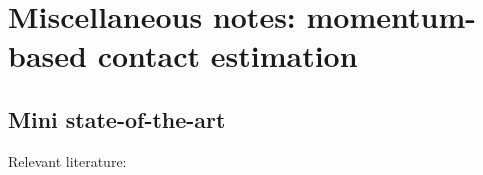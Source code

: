 \documentclass[letterpaper, 10 pt, conference]{ieeeconf}  %
\begin{document}
\section{Miscellaneous notes: momentum-based contact estimation}\label{momentum_base_estimator}
\subsection{Mini state-of-the-art}
Relevant literature: \cite{force_estimation::bledt2018contact}
\cite{force_estimation::briquet2017generalized}
\cite{force_estimation::de2008exploiting}
\cite{force_estimation::haddadin2017robot}
\cite{force_estimation::han2019collision}
\cite{force_estimation::iskandar2021collision}
\cite{force_estimation::li2021nonlinear}
\cite{force_estimation::long2022novel}
\cite{force_estimation::morlando2021whole}
\cite{force_estimation::tian2016sensorless}
\cite{force_estimation::vorndamme2017collision}
\end{document}
